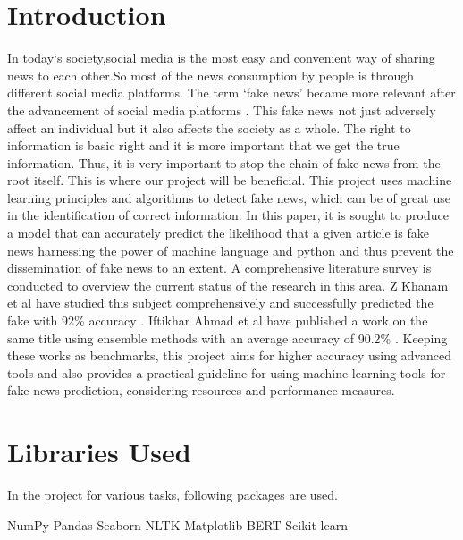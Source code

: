 \documentclass{josis}
\begin{document}
\section{Introduction}
In today‘s society,social media is the most easy and convenient way of sharing news to each other.So most of the news consumption by people is through different social media platforms. The term ‘fake news’ became more relevant after the advancement of social media platforms \cite{baarir2021fake}. This fake news not just adversely affect an individual but it also affects the society as a whole.  The right to information is basic right and it is more important that we get the true information. Thus, it is very important to stop the chain of fake news from the root itself.  This is where our project will be beneficial. This project uses machine learning principles and algorithms to detect fake news, which can be of great use in the identification of correct information. In this paper, it is sought to produce a model that can accurately predict the likelihood that a given article is fake news harnessing the power of machine language and python and thus prevent the dissemination of fake news to an extent. A comprehensive literature survey is conducted to overview the current status of the research in this area. Z Khanam et al have studied this subject comprehensively and successfully predicted the fake with 92\% accuracy \cite{khanam2021fake}. Iftikhar Ahmad et al have published a work on the same title using ensemble methods with an average accuracy of 90.2\% \cite{ahmad2020fake}. Keeping these works as benchmarks, this project aims for higher accuracy using advanced tools and also provides a practical guideline for using machine learning tools for fake news prediction, considering resources and performance measures.
\section{Libraries Used}
In the project for various tasks, following packages are used.
\begin{python}
    NumPy
    Pandas
    Seaborn
    NLTK
    Matplotlib
    BERT
    Scikit-learn
\end{python}
\end{document}
